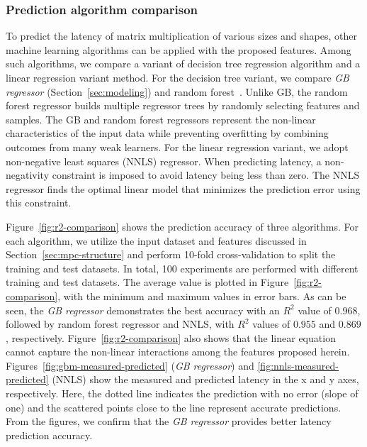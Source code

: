 \documentclass[10pt, conference, compsocconf]{IEEEtran}
\begin{document}
\subsubsection{Prediction algorithm comparison}
To predict the latency of matrix multiplication of various sizes and shapes, other machine learning algorithms can be applied with the proposed features. Among such algorithms, we compare a variant of decision tree regression algorithm and a linear regression variant method. For the decision tree variant, we compare \textit{GB regressor} (Section~\ref{sec:modeling}) and random forest~\cite{random-forest}. Unlike GB, the random forest regressor builds multiple regressor trees by randomly selecting features and samples. The GB and random forest regressors represent the non-linear characteristics of the input data while preventing overfitting by combining outcomes from many weak learners. For the linear regression variant, we adopt non-negative least squares (NNLS) regressor. When predicting latency, a non-negativity constraint is imposed to avoid latency being less than zero. The NNLS regressor finds the optimal linear model that minimizes the prediction error using this constraint.

Figure~\ref{fig:r2-comparison} shows the prediction accuracy of three algorithms. For each algorithm, we utilize the input dataset and features discussed in Section~\ref{sec:mpc-structure} and perform 10-fold cross-validation to split the training and test datasets. In total, 100 experiments are performed with different training and test datasets. The average value is plotted in Figure~\ref{fig:r2-comparison}, with the minimum and maximum values in error bars. As can be seen, the \textit{GB regressor} demonstrates the best accuracy with an $R^2$ value of $0.968$, followed by random forest regressor and NNLS, with  $R^2$ values of $0.955$ and $0.869$, respectively. Figure~\ref{fig:r2-comparison} also shows that the linear equation cannot capture the non-linear interactions among the features proposed herein. Figures~\ref{fig:gbm-measured-predicted} (\textit{GB regressor}) and \ref{fig:nnls-measured-predicted} (NNLS) show the measured and predicted latency in the x and y axes, respectively. Here, the dotted line indicates the prediction with no error (slope of one) and the scattered points close to the line represent accurate predictions. From the figures, we confirm that the \textit{GB regressor} provides better latency prediction accuracy.
\end{document}
